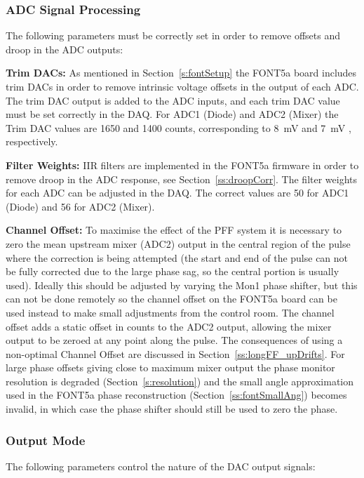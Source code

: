 \subsubsection{ADC Signal Processing}

The following parameters must be correctly set in order to remove offsets and droop in the ADC outputs:

\textbf{Trim DACs:} As mentioned in Section~\ref{s:fontSetup} the FONT5a board includes trim DACs in order to remove intrinsic voltage offsets in the output of each ADC. The trim DAC output is added to the ADC inputs, and each trim DAC value must be set correctly in the DAQ. For ADC1 (Diode) and ADC2 (Mixer) the Trim DAC values are 1650 and 1400 counts, corresponding to 8~mV and 7~mV \cite{dougThesis}, respectively.

\textbf{Filter Weights:} IIR filters are implemented in the FONT5a firmware in order to remove droop in the ADC response, see Section~\ref{ss:droopCorr}. The filter weights for each ADC can be adjusted in the DAQ. The correct values are 50 for ADC1 (Diode) and 56 for ADC2 (Mixer).

\textbf{Channel Offset:} To maximise the effect of the PFF system it is necessary to zero the mean upstream mixer (ADC2) output in the central region of the pulse where the correction is being attempted (the start and end of the pulse can not be fully corrected due to the large phase sag, so the central portion is usually used). Ideally this should be adjusted by varying the Mon1 phase shifter, but this can not be done remotely so the channel offset on the FONT5a board can be used instead to make small adjustments from the control room. The channel offset adds a static offset in counts to the ADC2 output, allowing the mixer output to be zeroed at any point along the pulse. The consequences of using a non-optimal Channel Offset are discussed in Section~\ref{ss:longFF_upDrifts}. For large phase offsets giving close to maximum mixer output the phase monitor resolution is degraded (Section~\ref{s:resolution}) and the small angle approximation used in the FONT5a phase reconstruction (Section~\ref{ss:fontSmallAng}) becomes invalid, in which case the phase shifter should still be used to zero the phase. 

\subsubsection{Output Mode}

The following parameters control the nature of the DAC output signals:

